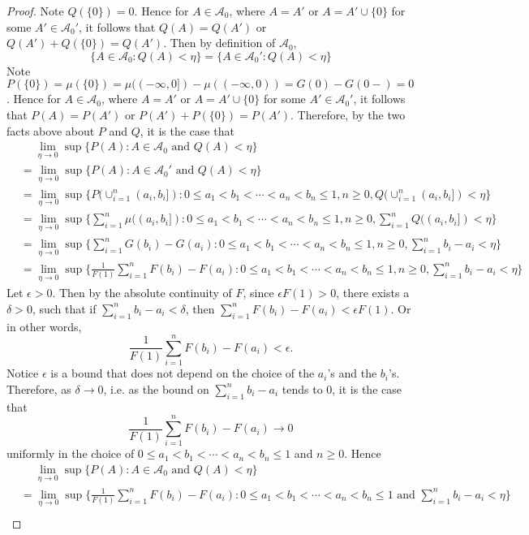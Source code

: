 \documentclass[letterpaper, 12pt]{article}
\newcommand{\cA}{\mathcal{A}}
\newcommand{\sion}{\sum_{i=1}^n}
\begin{document}
\begin{proof}
Note $Q(\{0\}) = 0$. 
Hence for $A \in \cA_0$, where $A = A'$ or $A=A' \cup \{0\}$ for some $A' \in \cA_0'$, it follows that $Q(A) = Q(A')$ or $Q(A') + Q(\{0\}) = Q(A')$.
Then by definition of $\cA_0$,
\[
\{A \in \cA_0 : Q(A) < \eta\} = \{A \in \cA_0' : Q(A) < \eta\}
\]
Note $P(\{0\}) = \mu(\{0\}) = \mu((-\infty, 0]) - \mu((-\infty, 0)) = G(0) - G(0-)  = 0$. Hence for $A \in \cA_0$, where $A = A'$ or $A=A' \cup \{0\}$ for some $A' \in \cA_0'$, it follows that $P(A) = P(A')$ or $P(A') + P(\{0\}) = P(A')$. Therefore, by the two facts above about $P$ and $Q$, it is the case that
\begin{align*}
&\quad\;\lim_{\eta \to 0} \sup\{ P(A): A  \in \cA_0 \text{ and } Q(A) < \eta \} 
\\
&=
\lim_{\eta \to 0} \sup\{ P(A): A  \in \cA_0' \text{ and } Q(A) < \eta \}
\\
&=
\lim_{\eta \to 0} \sup\{ P(\cup_{i=1}^n (a_i, b_i]): 0 \leq a_1 < b_1 < \cdots < a_n < b_n \leq 1, n \geq 0, Q(\cup_{i=1}^n (a_i, b_i]) < \eta \}
\\
&=
\lim_{\eta \to 0} \sup\{ \sion \mu((a_i, b_i]): 0 \leq a_1 < b_1 < \cdots < a_n < b_n \leq 1, n \geq 0, \sion Q((a_i, b_i]) < \eta \}
\\
&=
\lim_{\eta \to 0} \sup\{ \sion G(b_i) - G(a_i): 0 \leq a_1 < b_1 < \cdots < a_n < b_n \leq 1, n \geq 0, \sion b_i - a_i < \eta \}
\\
&=
\lim_{\eta \to 0} \sup\{ \frac{1}{F(1)}\sion F(b_i) - F(a_i): 0 \leq a_1 < b_1 < \cdots < a_n < b_n \leq 1, n \geq 0, \sion b_i - a_i < \eta \}
\end{align*}
Let $\epsilon > 0$. Then by the absolute continuity of $F$, since $\epsilon F(1) > 0$, there exists a $\delta > 0$, such that if $\sion b_i - a_i < \delta$, then $\sion F(b_i) - F(a_i) < \epsilon F(1)$. Or in other words, 
\[
\frac{1}{F(1)}\sion F(b_i) - F(a_i) < \epsilon.
\]
Notice $\epsilon$ is a bound that does not depend on the choice of the $a_i$'s and the $b_i$'s.
Therefore, as $\delta \to 0$, i.e. as the bound on $\sion b_i - a_i$ tends to $0$, it is the case that 
\[
\frac{1}{F(1)}\sion F(b_i) - F(a_i) \to 0
\] 
uniformly in the choice of 
$0 \leq a_1 < b_1 < \cdots < a_n < b_n \leq 1$ and $n \geq 0$. Hence
\begin{align*}
&\quad\;\lim_{\eta \to 0} \sup\{ P(A): A  \in \cA_0 \text{ and } Q(A) < \eta \} 
\\
&=
\lim_{\eta \to 0} \sup\{ \frac{1}{F(1)}\sion F(b_i) - F(a_i): 0 \leq a_1 < b_1 < \cdots < a_n < b_n \leq 1 \text{ and } \sion b_i - a_i < \eta \}
\\

\end{align*}
\end{proof}
\end{document}
